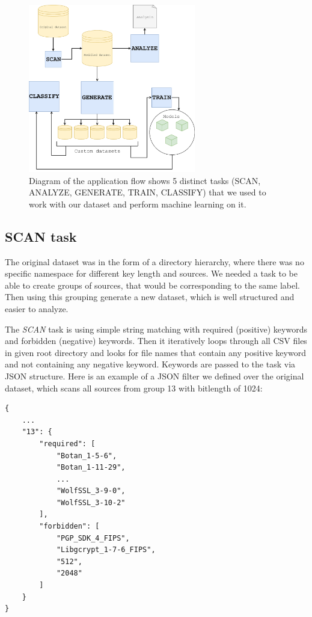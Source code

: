\begin{figure}[H]
\centering
\includegraphics[width=0.65\textwidth]{tex/images/thesis_model}
\caption{Diagram of the application flow shows 5 distinct tasks (SCAN, ANALYZE, GENERATE, TRAIN, CLASSIFY) that we used to work with our dataset and perform machine learning on it.}
\label{figure-model}
\end{figure}

\subsection{SCAN task}

The original dataset was in the form of a directory hierarchy, where there was no specific namespace for different key length and sources. We needed a task to be able to create groups of sources, that would be corresponding to the same label. Then using this grouping generate a new dataset, which is well structured and easier to analyze.

The \textit{SCAN} task is using simple string matching with required (positive) keywords and forbidden (negative) keywords. Then it iteratively loops through all CSV files in given root directory and looks for file names that contain any positive keyword and not containing any negative keyword. Keywords are passed to the task via JSON structure. Here is an example of a JSON filter we defined over the original dataset, which scans all sources from group 13 with bitlength of 1024: 

\begin{verbatim}
{
    ...
    "13": {
        "required": [
            "Botan_1-5-6",
            "Botan_1-11-29",
            ...
            "WolfSSL_3-9-0",
            "WolfSSL_3-10-2"
        ],
        "forbidden": [
            "PGP_SDK_4_FIPS",
            "Libgcrypt_1-7-6_FIPS",
            "512",
            "2048"
        ]
    }
}

\end{verbatim}

